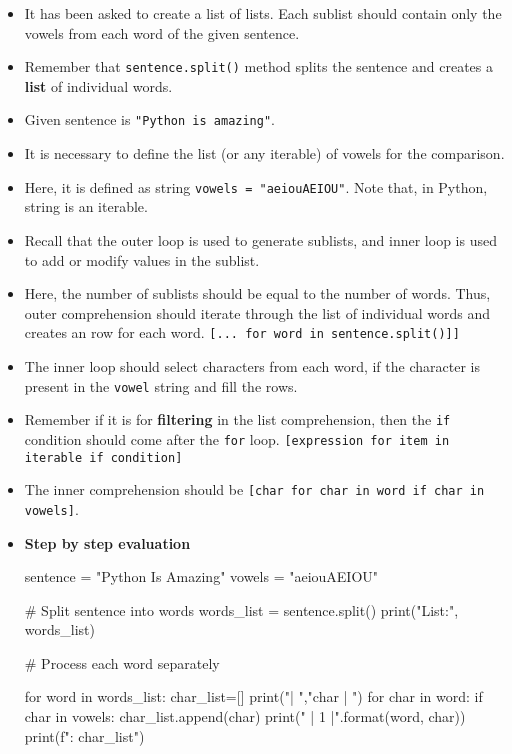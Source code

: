 \documentclass[10pt]{extarticle}
\begin{document}
\begin{itemize}
    \item It has been asked to create a list of lists. Each sublist should contain only the vowels from each word of the given sentence.
    \item Remember that \colorbox{gray!20}{\texttt{sentence.split()}} method splits the sentence and creates a \textbf{list} of individual words.
    \item Given sentence is \colorbox{gray!20}{\texttt{"Python is amazing"}}. 
    \item It is necessary to define the list (or any iterable) of vowels for the comparison. 
    \item Here, it is defined as string \colorbox{gray!20}{\texttt{vowels = "aeiouAEIOU"}}. Note that, in Python, string is an iterable. 
    \item Recall that the outer loop is used to generate sublists, and inner loop is used to add or modify values in the sublist.
    \item Here, the number of sublists should be equal to the number of words. Thus, outer comprehension should iterate through the list of individual words and creates an row for each word. \colorbox{gray!20}{\texttt{[... for word in sentence.split()]]}} 
    \item The inner loop should select characters from each word, if the character is present in the \texttt{vowel} string and fill the rows. 
    \item Remember if it is for \textbf{filtering} in the list comprehension, then the \texttt{if} condition should come after the \texttt{for} loop. \colorbox{gray!20}{\texttt{[expression for item in iterable if condition]}}  
    \item The inner comprehension should be \colorbox{gray!20}{\texttt{[char for char in word if char in vowels]}}.
    \item \textbf{Step by step evaluation}
    \begin{tcolorbox}[colback=gray!20, colframe=gray!50, sharp corners=southwest]
    \begin{pycode}
sentence = "Python Is Amazing"
vowels = "aeiouAEIOU"

# Split sentence into words
words_list = sentence.split()
print("\nWords List:", words_list)  

# Process each word separately

for word in words_list:
  char_list=[]
  print("\nword | ","char | ")
  for char in word:
    if char in vowels: 
      char_list.append(char)
      print(" | {1} |".format(word, char))
  print(f"\nSublist: {char_list}")  

    \end{pycode}
    \end{tcolorbox}
\end{itemize}
\end{document}
